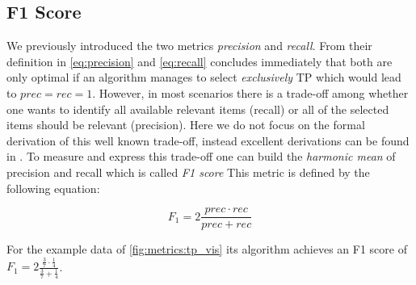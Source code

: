 \subsection{F1 Score}
\label{chp:fundamentals:sec:metrics:subsec:f1_score}

We previously introduced the two metrics \textit{precision} and \textit{recall}.
From their definition in \cref{eq:precision} and \cref{eq:recall} concludes immediately that both are only optimal if an algorithm manages to select \textit{exclusively} \ac{TP} which would lead to $prec = rec = 1$.
However, in most scenarios there is a trade-off among whether one wants to identify all available relevant items (recall) or all of the selected items should be relevant (precision).
Here we do not focus on the formal derivation of this well known trade-off, instead excellent derivations can be found in \textcites{Gordon:1989}{Zhu:2004}.
To measure and express this trade-off one can build the \textit{harmonic mean} of precision and recall which is called \textit{F1 score} \parencite{Powers:2011}
This metric is defined by the following equation:

\begin{equation}\label{eq:f1_score}
    F_1 = 2 \frac{prec \cdot rec}{prec+rec}
\end{equation}

For the example data of \cref{fig:metrics:tp_vis} its algorithm achieves an F1 score of $F_1 = 2 \frac{\frac{3}{7} \cdot \frac{1}{4}}{\frac{3}{7}+\frac{1}{4}}$.
